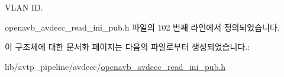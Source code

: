 V\+L\+AN ID. 



openavb\+\_\+avdecc\+\_\+read\+\_\+ini\+\_\+pub.\+h 파일의 102 번째 라인에서 정의되었습니다.



이 구조체에 대한 문서화 페이지는 다음의 파일로부터 생성되었습니다.\+:\begin{DoxyCompactItemize}
\item 
lib/avtp\+\_\+pipeline/avdecc/\hyperlink{openavb__avdecc__read__ini__pub_8h}{openavb\+\_\+avdecc\+\_\+read\+\_\+ini\+\_\+pub.\+h}\end{DoxyCompactItemize}
